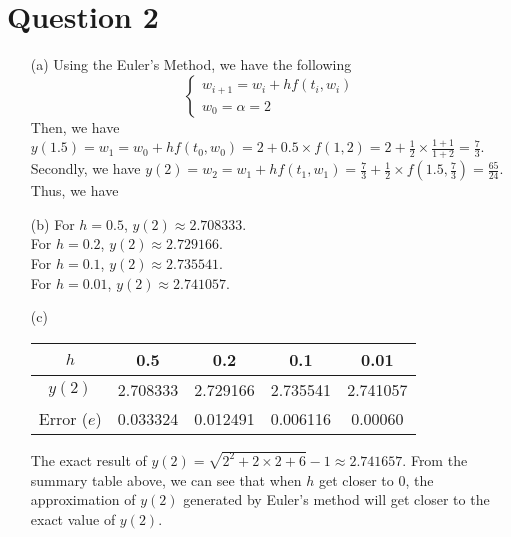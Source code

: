 \documentclass[11pt]{article}
\newcommand*{\boxtex}[1]{\framebox{#1}}
\begin{document}
\section*{Question 2}
\begin{itemize}
	\item [(a)]
	Using the Euler's Method, we have the following
	\[
	\begin{cases}
	w_{i+1}=w_i + hf(t_i,w_i)\\
	w_0 = \alpha = 2
	\end{cases}
	\]
	Then, we have $ y(1.5) = w_1 = w_0 + hf(t_0,w_0) = 2 + 0.5 \times f(1,2) = 2 + \frac{1}{2}\times \frac{1+1}{1+2} = \frac{7}{3} $.\\
	Secondly, we have $ y(2) = w_2 = w_1 + hf(t_1,w_1) = \frac{7}{3} + \frac{1}{2}\times f \left( 1.5,\frac{7}{3} \right) = \frac{65}{24}$.\\
	Thus, we have \boxtex{$ y(2) = \frac{65}{24} \approx 2.70833 $}
	\item [(b)]
	For $ h = 0.5 $, $ y(2)\approx 2.708333$.\\
	For $ h = 0.2 $, $ y(2)\approx 2.729166$.\\
	For $ h = 0.1 $, $ y(2)\approx 2.735541$.\\
	For $ h = 0.01 $, $ y(2)\approx 2.741057 $.\\
	
	\item [(c)]
	\begin{table}[h]
		\centering
		\begin{tabular}{c|cccc}
			$ h $ & 0.5 & 0.2 & 0.1 & 0.01    \\ \hline
			$ y(2) $ & 2.708333 & 2.729166 & 2.735541 & 2.741057 \\ \hline
			Error ($ e $) & 0.033324 & 0.012491 & 0.006116 & 0.00060
		\end{tabular}
	\end{table}
	The exact result of $ y(2) = \sqrt{2^2+2 \times 2+6} -1  \approx 2.741657$. From the summary table above, we can see that when $ h $ get closer to $ 0 $, the approximation of $ y(2) $ generated by Euler's method will get closer to the exact value of $ y(2) $.
\end{itemize}
\end{document}
